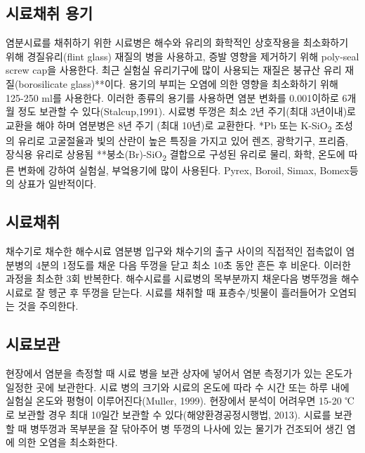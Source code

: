 \documentclass[
]{book}
\begin{document}
\hypertarget{uxc2dcuxb8ccuxcc44uxcde8-uxc6a9uxae30}{%
\subsection{시료채취 용기}\label{uxc2dcuxb8ccuxcc44uxcde8-uxc6a9uxae30}}

염분시료를 채취하기 위한 시료병은 해수와 유리의 화학적인 상호작용을 최소화하기 위해 경질유리(flint glass) 재질의 병을 사용하고, 증발 영향을 제거하기 위해 poly-seal screw cap을 사용한다. 최근 실험실 유리기구에 많이 사용되는 재질은 붕규산 유리 재질(borosilicate glass)**이다. 용기의 부피는 오염에 의한 영향을 최소화하기 위해 125-250 ml를 사용한다. 이러한 종류의 용기를 사용하면 염분 변화를 0.001이하로 6개월 정도 보관할 수 있다(Stalcup,1991). 시료병 뚜껑은 최소 2년 주기(최대 3년이내)로 교환을 해야 하며 염분병은 8년 주기 (최대 10년)로 교환한다.
*Pb 또는 K-SiO\textsubscript{2} 조성의 유리로 고굴절율과 빛의 산란이 높은 특징을 가지고 있어 렌즈, 광학기구, 프리즘, 장식용 유리로 상용됨
**붕소(Br)-SiO\textsubscript{2} 결합으로 구성된 유리로 물리, 화학, 온도에 따른 변화에 강하여 실험실, 부엌용기에 많이 사용된다. Pyrex, Boroil, Simax, Bomex등의 상표가 일반적이다.

\hypertarget{uxc2dcuxb8ccuxcc44uxcde8}{%
\subsection{시료채취}\label{uxc2dcuxb8ccuxcc44uxcde8}}

채수기로 채수한 해수시료 염분병 입구와 채수기의 출구 사이의 직접적인 접촉없이 염분병의 4분의 1정도를 채운 다음 뚜껑을 닫고 최소 10초 동안 흔든 후 비운다. 이러한 과정을 최소한 3회 반복한다. 해수시료를 시료병의 목부분까지 채운다음 병뚜껑을 해수시료로 잘 헹군 후 뚜껑을 닫는다. 시료를 채취할 때 표층수/빗물이 흘러들어가 오염되는 것을 주의한다.

\hypertarget{uxc2dcuxb8ccuxbcf4uxad00}{%
\subsection{시료보관}\label{uxc2dcuxb8ccuxbcf4uxad00}}

현장에서 염분을 측정할 때 시료 병을 보관 상자에 넣어서 염분 측정기가 있는 온도가 일정한 곳에 보관한다. 시료 병의 크기와 시료의 온도에 따라 수 시간 또는 하루 내에 실험실 온도와 평형이 이루어진다(Muller, 1999). 현장에서 분석이 어려우면 15-20 ℃로 보관할 경우 최대 10일간 보관할 수 있다(해양환경공정시행법, 2013). 시료를 보관할 때 병뚜껑과 목부분을 잘 닦아주어 병 뚜껑의 나사에 있는 물기가 건조되어 생긴 염에 의한 오염을 최소화한다.
\end{document}
